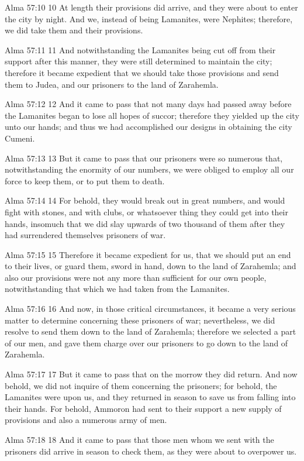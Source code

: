 Alma 57:10
 10 At length their provisions did arrive, and they were about to
enter the city by night. And we, instead of being Lamanites,
were Nephites; therefore, we did take them and their provisions.

Alma 57:11
 11 And notwithstanding the Lamanites being cut off from their
support after this manner, they were still determined to maintain
the city; therefore it became expedient that we should take those
provisions and send them to Judea, and our prisoners to the land
of Zarahemla.

Alma 57:12
 12 And it came to pass that not many days had passed away before
the Lamanites began to lose all hopes of succor; therefore they
yielded up the city unto our hands; and thus we had accomplished
our designs in obtaining the city Cumeni.

Alma 57:13
 13 But it came to pass that our prisoners were so numerous that,
notwithstanding the enormity of our numbers, we were obliged to
employ all our force to keep them, or to put them to death.

Alma 57:14
 14 For behold, they would break out in great numbers, and would
fight with stones, and with clubs, or whatsoever thing they could
get into their hands, insomuch that we did slay upwards of two
thousand of them after they had surrendered themselves prisoners
of war.

Alma 57:15
 15 Therefore it became expedient for us, that we should put an
end to their lives, or guard them, sword in hand, down to the
land of Zarahemla; and also our provisions were not any more than
sufficient for our own people, notwithstanding that which we had
taken from the Lamanites.

Alma 57:16
 16 And now, in those critical circumstances, it became a very
serious matter to determine concerning these prisoners of war;
nevertheless, we did resolve to send them down to the land of
Zarahemla; therefore we selected a part of our men, and gave them
charge over our prisoners to go down to the land of Zarahemla.

Alma 57:17
 17 But it came to pass that on the morrow they did return. And
now behold, we did not inquire of them concerning the prisoners;
for behold, the Lamanites were upon us, and they returned in
season to save us from falling into their hands. For behold,
Ammoron had sent to their support a new supply of provisions and
also a numerous army of men.

Alma 57:18
 18 And it came to pass that those men whom we sent with the
prisoners did arrive in season to check them, as they were about
to overpower us.

